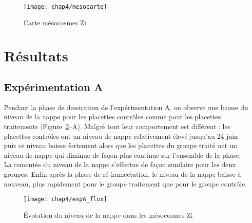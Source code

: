 \begin{figure}
\centering
\texttt{[image: chap4/mesocarte]}
\caption{Carte mésocosmes Zi}
\label{fig:mesocarte}
\end{figure}


\section{Résultats}

\subsection{Expérimentation A}

Pendant la phase de dessication de l'expérimentation A, on observe une baisse du niveau de la nappe pour les placettes contrôles comme pour les placettes traitements (Figure~\ref{fig:HMzi}--A).
Malgré tout leur comportement est différent : les placettes contrôles ont un niveau de nappe relativement élevé jusqu'au 24 juin puis ce niveau baisse fortement alors que les placettes du groupe traité ont un niveau de nappe qui diminue de façon plus continue sur l'ensemble de la phase.
La remontée du niveau de la nappe s'effectue de façon similaire pour les deux groupes.
Enfin après la phase de ré-humectation, le niveau de la nappe baisse à nouveau, plus rapidement pour le groupe traitement que pour le groupe contrôle.


\begin{figure}
\centering
\texttt{[image: chap4/expA\_flux]}
\caption{Évolution du niveau de la nappe dans les mésocosmes Zi}
\label{fig:HMzi}
\end{figure}




